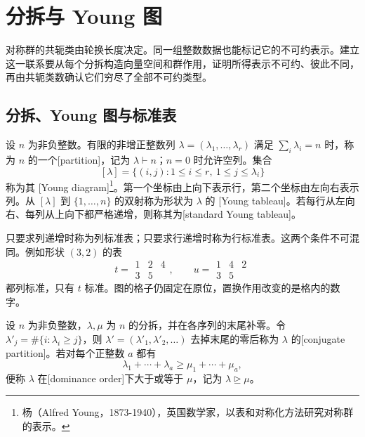 \section{分拆与 Young 图}
\label{b5:sec:0601}

对称群的共轭类由轮换长度决定。同一组整数数据也能标记它的不可约表示。建立这一联系要从每个分拆构造向量空间和群作用，证明所得表示不可约、彼此不同，再由共轭类数确认它们穷尽了全部不可约类型。

\subsection{分拆、Young 图与标准表}
\label{b5:subsec:0601:01}

\begin{definition}\label{b5:def:partition-tableau}
	设 \(n\) 为非负整数。有限的非增正整数列 \(\lambda=(\lambda_1,\ldots,\lambda_r)\) 满足 \(\sum_i\lambda_i=n\) 时，称为 \(n\) 的一个[partition]，记为 \(\lambda\vdash n\)；\(n=0\) 时允许空列。集合
	\[
		[\lambda]=\bigl\{(i,j):1\leq i\leq r,\ 1\leq j\leq\lambda_i\bigr\}
	\]
	称为其 [Young diagram]\footnote{杨（Alfred Young，1873-1940），英国数学家，以表和对称化方法研究对称群的表示。}。第一个坐标由上向下表示行，第二个坐标由左向右表示列。从 \([\lambda]\) 到 \(\{1,\ldots,n\}\) 的双射称为形状为 \(\lambda\) 的 [Young tableau]。若每行从左向右、每列从上向下都严格递增，则称其为[standard Young tableau]。
\end{definition}

只要求列递增时称为列标准表；只要求行递增时称为行标准表。这两个条件不可混同。例如形状 \((3,2)\) 的表
\[
	t=\begin{array}{ccc}1&2&4\\3&5&\end{array},
	\qquad
	u=\begin{array}{ccc}1&4&2\\3&5&\end{array}
\]
都列标准，只有 \(t\) 标准。图的格子仍固定在原位，置换作用改变的是格内的数字。

\begin{definition}\label{b5:def:conjugate-dominance}
	设 \(n\) 为非负整数，\(\lambda,\mu\) 为 \(n\) 的分拆，并在各序列的末尾补零。令 \(\lambda'_j=\#\{i:\lambda_i\geq j\}\)，则 \(\lambda'=(\lambda'_1,\lambda'_2,\ldots)\) 去掉末尾的零后称为 \(\lambda\) 的[conjugate partition]。若对每个正整数 \(a\) 都有
	\[
		\lambda_1+\cdots+\lambda_a\geq\mu_1+\cdots+\mu_a,
	\]
	便称 \(\lambda\) 在[dominance order]下大于或等于 \(\mu\)，记为 \(\lambda\trianglerighteq\mu\)。
\end{definition}


